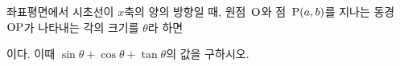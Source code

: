 좌표평면에서 시초선이 $x$축의 양의 방향일 때, 원점~$\mathrm{O}$와 점~$\mathrm{P}(a{,}\mkern3mu\mathopen{}b)$를 지나는 동경~$\mathrm{OP}$가 나타내는 각의 크기를 $\theta$라 하면 \par\smallskip{}\par\smallskip\noindent 이다. 이때 $\sin\theta+\cos\theta+\tan\theta$의 값을 구하시오. 
